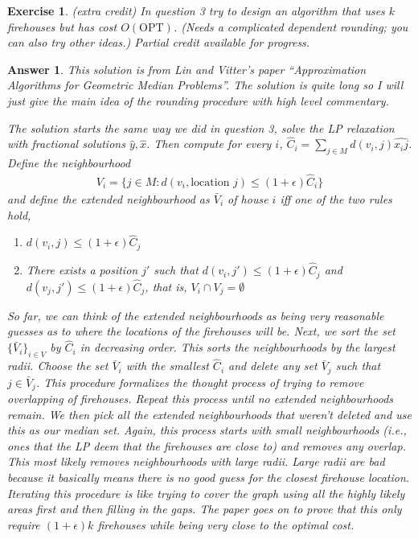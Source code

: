 \documentclass[12pt]{article}
\theoremstyle{colon}
\newtheorem{exercise}{Exercise}
\newtheorem*{answer}{Answer}
\begin{document}
\clearpage

\begin{exercise}
  (extra credit) In question 3 try to design an algorithm that uses $k$ firehouses but has cost $O(\text{OPT})$. (Needs a complicated dependent rounding; you can also try other ideas.) Partial credit available for progress.
\end{exercise}

\begin{answer}
  This solution is from Lin and Vitter's paper ``Approximation Algorithms for Geometric Median Problems''. The solution is quite long so I will just give the main idea of the rounding procedure with high level commentary.

  The solution starts the same way we did in question 3, solve the LP relaxation with fractional solutions $\hat{y}, \hat{x}$. Then compute for every $i$, $\hat{C}_i = \sum_{j \in M} d(v_i, j) \hat{x_ij}$. Define the neighbourhood
  \begin{gather*}
    V_i = \{ j \in M: d(v_i, \text{location } j) \leq (1+\epsilon) \hat{C}_i\}
  \end{gather*}
  and define the extended neighbourhood as $\bar{V}_i$ of house $i$ iff one of the two rules hold,
  \begin{enumerate}
      \item $d(v_i, j) \leq (1+\epsilon) \hat{C}_j$
      \item There exists a position $j'$ such that $d(v_i, j') \leq (1+\epsilon) \hat{C}_j$ and $d(v_j, j') \leq (1+\epsilon) \hat{C}_j$, that is, $V_i \cap V_j = \emptyset$
  \end{enumerate}

  So far, we can think of the extended neighbourhoods as being very reasonable guesses as to where the locations of the firehouses will be. Next, we sort the set $\{ \bar{V}_i \}_{i \in V}$ by $\hat{C}_i$ in decreasing order. This sorts the neighbourhoods by the largest radii. Choose the set $\bar{V}_i$ with the smallest $\hat{C}_i$ and delete any set $\bar{V}_j$ such that $j \in \bar{V}_j$. This procedure formalizes the thought process of trying to remove overlapping of firehouses. Repeat this process until no extended neighbourhoods remain. We then pick all the extended neighbourhoods that weren't deleted and use this as our median set. Again, this process starts with small neighbourhoods (i.e., ones that the LP deem that the firehouses are close to) and removes any overlap. This most likely removes neighbourhoods with large radii. Large radii are bad because it basically means there is no good guess for the closest firehouse location. Iterating this procedure is like trying to cover the graph using all the highly likely areas first and then filling in the gaps. The paper goes on to prove that this only require $(1+\epsilon)k$ firehouses while being very close to the optimal cost.
\end{answer}
\end{document}
